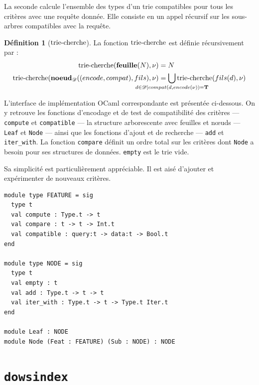 \documentclass[a4paper]{report}
\theoremstyle{definition}
\newtheorem{definition}[theoreme]{Définition}
\newcommand{\dowsindex}{\texttt{dowsindex}\xspace}
\newcommand{\mathhyphen}{{\hbox{-}}}
\begin{document}
La seconde calcule l'ensemble des types d'un trie compatibles pour tous les critères avec une requête donnée. Elle consiste en un appel récursif sur les sous-arbres compatibles avec la requête.

\begin{definition}[$\mathrm{trie\mathhyphen cherche}$]
	La fonction $\mathrm{trie\mathhyphen cherche}$ est définie récursivement par :
	\begin{align*}
			\mathrm{trie\mathhyphen cherche} (\bold{feuille} (N), \nu) &=
			N
		\\
			\mathrm{trie\mathhyphen cherche} (\bold{noeud}_\mathscr{D} ((encode, compat), fils), \nu) &=
			\bigcup_{\mathclap{{d \in \mathscr{D} \mid compat (d, encode (\nu)) = \bold{T}}}} \mathrm{trie\mathhyphen cherche} (fils (d), \nu)
	\end{align*}
\end{definition}

L'interface de implémentation OCaml correspondante est présentée ci-dessous. On y retrouve les fonctions d'encodage et de test de compatibilité des critères — \texttt{compute} et \texttt{compatible} — la structure arborescente avec feuilles et nœuds — \texttt{Leaf} et \texttt{Node} — ainsi que les fonctions d'ajout et de recherche — \texttt{add} et \texttt{iter_with}. La fonction \texttt{compare} définit un ordre total sur les critères dont \texttt{Node} a besoin pour ses structures de données. \texttt{empty} est le trie vide.

Sa simplicité est particulièrement appréciable. Il est aisé d'ajouter et expérimenter de nouveaux critères.

\begin{verbatim}
module type FEATURE = sig
  type t
  val compute : Type.t -> t
  val compare : t -> t -> Int.t
  val compatible : query:t -> data:t -> Bool.t
end

module type NODE = sig
  type t
  val empty : t
  val add : Type.t -> t -> t
  val iter_with : Type.t -> t -> Type.t Iter.t
end

module Leaf : NODE
module Node (Feat : FEATURE) (Sub : NODE) : NODE
\end{verbatim}


\chapter{\dowsindex}
\end{document}
